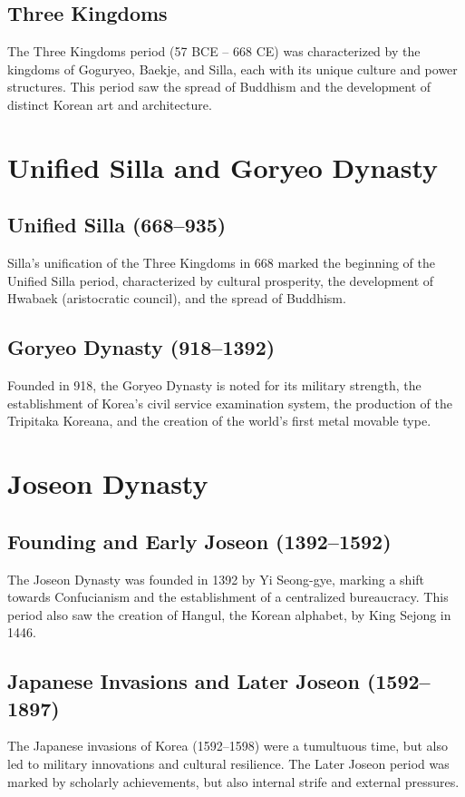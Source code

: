 \documentclass[a4paper,12pt]{book}
\begin{document}
\subsection{Three Kingdoms}
\label{subsec:three-kingdoms}
The Three Kingdoms period (57 BCE – 668 CE) was characterized by the kingdoms of Goguryeo, Baekje, and Silla, each with its unique culture and power structures. This period saw the spread of Buddhism and the development of distinct Korean art and architecture.

\section{Unified Silla and Goryeo Dynasty}
\label{sec:silla-goryeo}

\subsection{Unified Silla (668–935)}
\label{subsec:unified-silla}
Silla’s unification of the Three Kingdoms in 668 marked the beginning of the Unified Silla period, characterized by cultural prosperity, the development of Hwabaek (aristocratic council), and the spread of Buddhism.

\subsection{Goryeo Dynasty (918–1392)}
\label{subsec:goryeo-dynasty}
Founded in 918, the Goryeo Dynasty is noted for its military strength, the establishment of Korea’s civil service examination system, the production of the Tripitaka Koreana, and the creation of the world's first metal movable type.

\section{Joseon Dynasty}
\label{sec:joseon-dynasty}

\subsection{Founding and Early Joseon (1392–1592)}
\label{subsec:early-joseon}
The Joseon Dynasty was founded in 1392 by Yi Seong-gye, marking a shift towards Confucianism and the establishment of a centralized bureaucracy. This period also saw the creation of Hangul, the Korean alphabet, by King Sejong in 1446.

\subsection{Japanese Invasions and Later Joseon (1592–1897)}
\label{subsec:later-joseon}
The Japanese invasions of Korea (1592–1598) were a tumultuous time, but also led to military innovations and cultural resilience. The Later Joseon period was marked by scholarly achievements, but also internal strife and external pressures.
\end{document}
